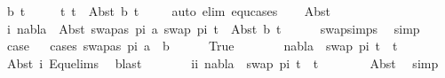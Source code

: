 \begin{isabellebody}
\ b\ t{}{\isacharprime}{\kern0pt}\isanewline
\ \ \ \ \ t{}{\isacharcolon}{\kern0pt}\ {\isachardoublequoteopen}t{}\ {\isacharequal}{\kern0pt}\ Abst\ b\ t{}{\isacharprime}{\kern0pt}{\isachardoublequoteclose}\isanewline
\ \ \ \ \isamarkupfalse%
{\isacharparenleft}{\kern0pt}auto\ elim{\isacharcolon}{\kern0pt}\ equ{\isachardot}{\kern0pt}cases{\isacharparenright}{\kern0pt}\isanewline
\ \ \isamarkupfalse%
\ Abst\ \isamarkupfalse%
\ i{\isacharcolon}{\kern0pt}\ {\isachardoublequoteopen}nabla\ {\isasymturnstile}\ Abst\ {\isacharparenleft}{\kern0pt}swapas\ pi{}\ a{\isacharparenright}{\kern0pt}\ {\isacharparenleft}{\kern0pt}swap\ pi{}\ t{}{\isacharprime}{\kern0pt}{\isacharparenright}{\kern0pt}\ {\isasymapprox}\ Abst\ b\ t{}{\isacharprime}{\kern0pt}{\isachardoublequoteclose}\isanewline
\ \ \ \ \isamarkupfalse%
\ swap{\isachardot}{\kern0pt}simps{\isacharparenleft}{\kern0pt}{}{\isacharparenright}{\kern0pt}\ \isamarkupfalse%
\ simp\isanewline
\ \ \isamarkupfalse%
\ \isamarkupfalse%
\ {\isacharquery}{\kern0pt}case\isanewline
\ \ \isamarkupfalse%
{\isacharparenleft}{\kern0pt}cases\ {\isacartoucheopen}swapas\ pi{}\ a\ {\isacharequal}{\kern0pt}\ b{\isacartoucheclose}{\isacharparenright}{\kern0pt}\isanewline
\ \ \ \ \isamarkupfalse%
\ True\isanewline
\ \ \ \ \isamarkupfalse%
\ \isamarkupfalse%
\ {\isachardoublequoteopen}nabla\ {\isasymturnstile}\ swap\ pi{}\ t{}{\isacharprime}{\kern0pt}\ {\isasymapprox}\ t{}{\isacharprime}{\kern0pt}{\isachardoublequoteclose}\ \isanewline
\ \ \ \ \ \ \isamarkupfalse%
\ Abst\ i\ Equ{\isacharunderscore}{\kern0pt}elims{\isacharparenleft}{\kern0pt}{}{\isacharparenright}{\kern0pt}\ \isamarkupfalse%
\ blast\isanewline
\ \ \ \ \isamarkupfalse%
\ \isamarkupfalse%
\ ii{\isacharcolon}{\kern0pt}\ {\isachardoublequoteopen}nabla\ {\isasymturnstile}\ swap\ pi{}\ t{}{\isacharprime}{\kern0pt}\ {\isasymapprox}\ t{}{\isacharprime}{\kern0pt}{\isachardoublequoteclose}\isanewline
\ \ \ \ \ \ \isamarkupfalse%
\ Abst\ \isamarkupfalse%
\ simp\isanewline
\ \ \ \ \isamarkupfalse%
\ \isamarkupfalse%

\end{isabellebody}
